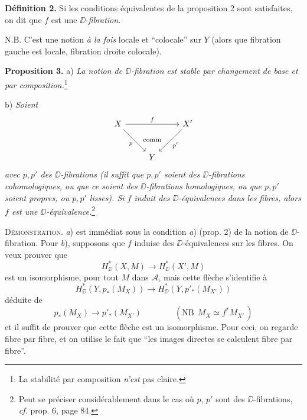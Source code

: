 \textbf{Définition 2.} Si les conditions équivalentes de la proposition 2 sont satisfaites, on dit que $f$ est une $\DD$-\textit{fibration}.

N.B. C'est une notion \textit{à la fois} locale et “colocale” sur $Y$ (alors que fibration gauche est locale, fibration droite colocale).


\textbf{Proposition 3.} a) \textit{La notion de $\DD$-fibration est stable par changement de base et par composition.}\footnote[38]{La stabilité par composition \textit{n'est} pas claire.}

\indent b) \textit{Soient}
\[
\begin{tikzcd}[column sep=normal, row sep=large]
X \arrow[rr, "f"] \arrow[dr, "p"'] & \phantom{X} & X' \arrow[dl, "p'"] \\
& Y &
\arrow[from=1-2, to=2-2, phantom, "\text{\footnotesize comm}"]
\end{tikzcd}
\]
\textit{avec $p,p'$ des $\DD$-fibrations (il suffit que $p,p'$ soient des $\DD$-fibrations cohomologiques, ou que ce soient des $\DD$-fibrations homologiques, ou que $p,p'$ soient propres, ou $p,p'$ lisses). Si $f$ induit des $\DD$-équivalences dans les fibres, alors $f$ est une $\DD$-équivalence.}\footnote[39]{Peut se préciser considérablement dans le cas où $p$, $p'$ sont des $\DD$-fibrations, \textit{cf.} prop. 6, page 84.}

\indent\textsc{Démonstration.} \textit{a}) est immédiat sous la condition \textit{a}) (prop. 2) de la notion de $\DD$-fibration. Pour \textit{b}), supposons que $f$ induise des $\DD$-équivalences sur les fibres. On veux prouver que %
\[
H^*_{\DD}(X,M) \longrightarrow H^*_{\DD}(X',M)
\]
est un isomorphisme, pour tout $M$ dans $\mathcal{A}$, mais cette flèche s'identifie à
\[
H^*_{\DD}(Y, p_*(M_X)) \longrightarrow H^*_{\DD}(Y, p'_*(M_{X'}))
\]
déduite de
\[
p_*(M_X) \longrightarrow p'_*(M_{X'}) \qquad\qquad (\text{NB}\ \ M_X \simeq f^*M_{X'}\,)
\]
et il suffit de prouver que cette flèche est un isomorphisme. Pour ceci, on regarde fibre par fibre, et on utilise le fait que “les images directes se calculent fibre par fibre”.

